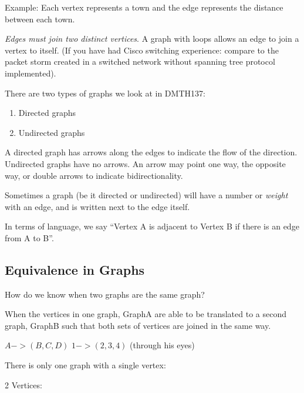 Example: Each vertex represents a town and the edge represents the distance
between each town.

\emph{Edges must join two distinct vertices}. A graph with loops allows an edge
to join a vertex to itself. (If you have had Cisco switching experience: compare to the
packet storm created in a switched network without spanning tree protocol
implemented).

There are two types of graphs we look at in DMTH137:
\begin{enumerate}
  \item Directed graphs
  \item Undirected graphs
\end{enumerate}

A directed graph has arrows along the edges to indicate the flow of the
direction. Undirected graphs have no arrows. An arrow may point one way, the
opposite way, or double arrows to indicate bidirectionality.



Sometimes a graph (be it directed or undirected) will have a number or
\emph{weight} with an edge, and is written next to the edge itself.


In terms of language, we say ``Vertex A is adjacent to Vertex B if there is an
edge from A to B''.

\subsection{Equivalence in Graphs}
How do we know when two graphs are the same graph?

When the vertices in one graph, GraphA are able to be translated to a second
graph, GraphB such that both sets of vertices are joined in the same way.

$ A-> (B,C,D) $ %
$ 1-> (2,3,4) $ %
(through his eyes)

There is only one graph with a single vertex:
\begin{tikzpicture}
\end{tikzpicture}


2 Vertices:

